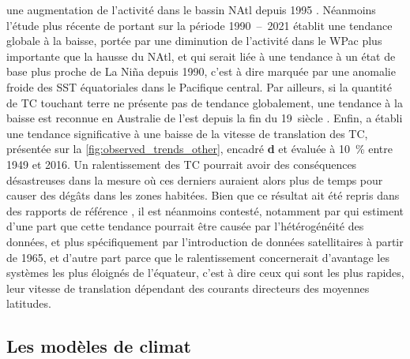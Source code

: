 \documentclass[../main.tex]{subfiles}
\begin{document}
une augmentation de l'activité dans le bassin NAtl depuis \num{1995}
\parencite{webster_changes_2005,maue_recent_2011,wang_climate_2010,seneviratne_weather_2021}. Néanmoins l'étude plus récente de \textcite{klotzbach_trends_2022}
portant sur la période \num{1990}~--~\num{2021} établit une tendance globale à la baisse, portée par une diminution de l'activité dans le WPac plus importante
que la hausse du NAtl, et qui serait liée à une tendance à un état de base plus proche de La Niña depuis \num{1990}, c'est à dire marquée par une anomalie
froide des SST équatoriales dans le Pacifique central. Par ailleurs, si la quantité de TC touchant terre ne présente pas de tendance globalement, une tendance à
la baisse est reconnue en Australie de l'est depuis la fin du \num{19}\ieme~siècle \parencite{knutson_tropical_2019,callaghan_variability_2011}. Enfin,
\textcite{kossin_global_2018,kossin_reply_2019} a établi une tendance significative à une baisse de la vitesse de translation des TC, présentée sur la
\cref{fig:observed_trends_other}, encadré \textbf{d} et évaluée à \SI{10}{\percent} entre \num{1949} et \num{2016}. Un ralentissement des TC pourrait avoir des
conséquences désastreuses dans la mesure où ces derniers auraient alors plus de temps pour causer des dégâts dans les zones habitées. Bien que ce résultat ait
été repris dans des rapports de référence \parencite{knutson_tropical_2019,seneviratne_weather_2021}, il est néanmoins contesté, notamment par
\textcite{lanzante_uncertainties_2019,moon_climate_2019} qui estiment d'une part que cette tendance pourrait être causée par l'hétérogénéité des données, et plus
spécifiquement par l'introduction de données satellitaires à partir de \num{1965}, et d'autre part parce que le ralentissement concernerait d'avantage les
systèmes les plus éloignés de l'équateur, c'est à dire ceux qui sont les plus rapides, leur vitesse de translation dépendant des courants directeurs des
moyennes latitudes.

\subsection{Les modèles de climat}\label{sec:modèles}
\end{document}
